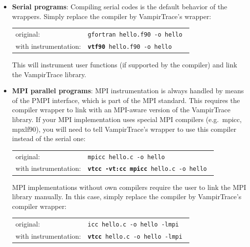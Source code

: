 \documentclass[a4paper,twoside,12pt,BCOR12mm]{scrbook}
\begin{document}
\begin{itemize}
\newlength{\commandtableskip}
\setlength{\commandtableskip}{1ex}

\item \textbf{Serial programs}:
Compiling serial codes is the default behavior of the wrappers.
Simply replace the compiler by VampirTrace's wrapper:

\vspace{\commandtableskip}
\begin{tabular}{ll}
original:              &  \tt gfortran hello.f90 -o hello  \\
with instrumentation:  &  \tt \textbf{vtf90} hello.f90 -o hello  \\
\end{tabular}
\vspace{\commandtableskip}

This will instrument user functions (if supported by the compiler) and
link the VampirTrace library.

\item \textbf{MPI parallel programs}:
MPI instrumentation is always handled by means of the PMPI interface, 
which is part of the MPI standard.
This requires the compiler wrapper to link with an MPI-aware version of
the VampirTrace library.
If your MPI implementation uses special MPI compilers (e.g.~mpicc, mpxlf90),
you will need to tell VampirTrace's wrapper to use this compiler
instead of the serial one:

\vspace{\commandtableskip}
\begin{tabular}{ll}
original:              &  \tt mpicc hello.c -o hello  \\
with instrumentation:  &  \tt \textbf{vtcc -vt:cc mpicc} hello.c -o hello  \\
\end{tabular}
\vspace{\commandtableskip}

MPI implementations without own compilers require the user to link
the MPI library manually. In this case, simply replace the compiler
by VampirTrace's compiler wrapper:

\vspace{\commandtableskip}
\begin{tabular}{ll}
original:              &  \tt icc hello.c -o hello -lmpi \\
with instrumentation:  &  \tt \textbf{vtcc} hello.c -o hello -lmpi  \\
\end{tabular}
\vspace{\commandtableskip}


\end{itemize}
\end{document}
